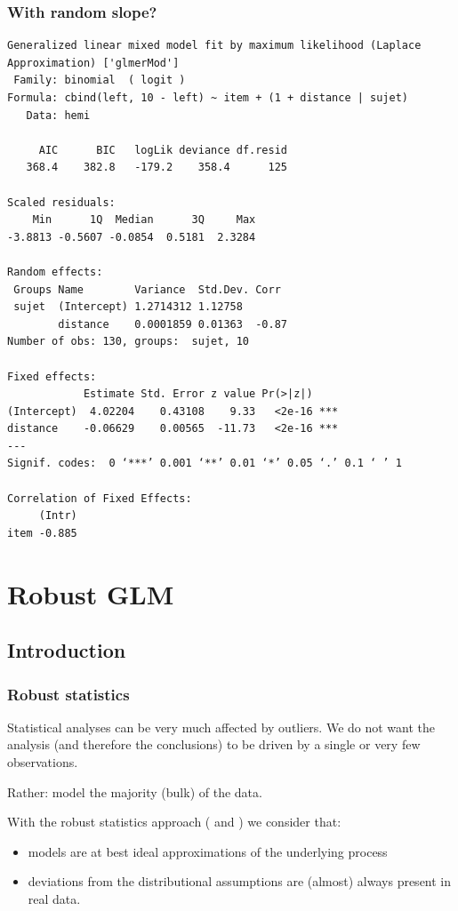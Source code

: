 \documentclass{beamer}
\newcommand{\bs}{\bigskip}
\begin{document}
\begin{frame}[fragile]
\frametitle{With random slope?}

{\tiny
\begin{verbatim}
Generalized linear mixed model fit by maximum likelihood (Laplace Approximation) ['glmerMod']
 Family: binomial  ( logit )
Formula: cbind(left, 10 - left) ~ item + (1 + distance | sujet)
   Data: hemi

     AIC      BIC   logLik deviance df.resid 
   368.4    382.8   -179.2    358.4      125 

Scaled residuals: 
    Min      1Q  Median      3Q     Max 
-3.8813 -0.5607 -0.0854  0.5181  2.3284 

Random effects:
 Groups Name        Variance  Std.Dev. Corr 
 sujet  (Intercept) 1.2714312 1.12758       
        distance    0.0001859 0.01363  -0.87
Number of obs: 130, groups:  sujet, 10

Fixed effects:
            Estimate Std. Error z value Pr(>|z|)    
(Intercept)  4.02204    0.43108    9.33   <2e-16 ***
distance    -0.06629    0.00565  -11.73   <2e-16 ***
---
Signif. codes:  0 ‘***’ 0.001 ‘**’ 0.01 ‘*’ 0.05 ‘.’ 0.1 ‘ ’ 1

Correlation of Fixed Effects:
     (Intr)
item -0.885
\end{verbatim}
}
\end{frame}
\section{Robust GLM}
\label{robust.section}

\subsection{Introduction}
\begin{frame}
\frametitle{Robust statistics}

Statistical analyses can be very much affected by outliers. We do not want the
analysis (and therefore the conclusions) to be driven by a single or very few
observations.

\bs
Rather: model the majority (bulk) of the data.

\bs
With the {\color{blue}robust statistics} approach ( and
) we consider that:
\begin{itemize}
\item models are at best ideal approximations of the underlying process
\item deviations from the distributional assumptions are (almost) always
present in real data.
\end{itemize}
\end{frame}
\end{document}
